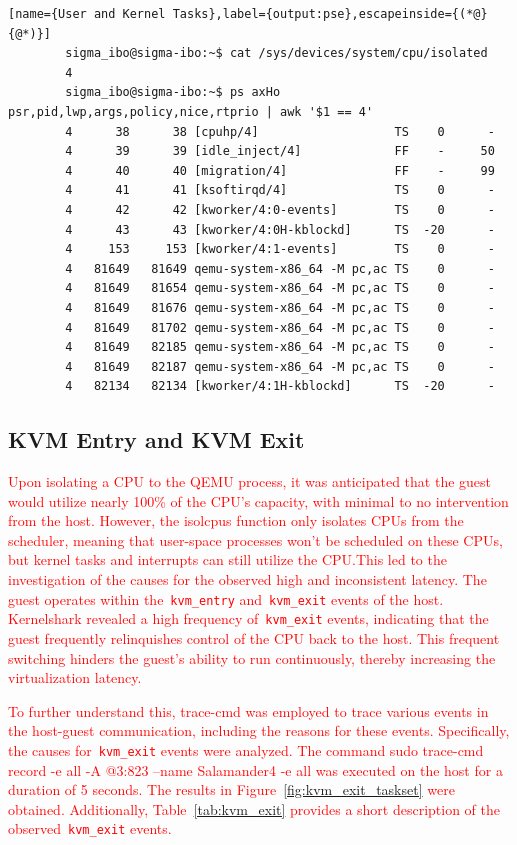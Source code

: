 \documentclass[MMR,Master,english]{twbook}
\begin{document}
\vspace{1em}
\begin{minipage}{0.95\columnwidth}
	\begin{lstlisting}[name={User and Kernel Tasks},label={output:pse},escapeinside={(*@}{@*)}]
		sigma_ibo@sigma-ibo:~$ cat /sys/devices/system/cpu/isolated
		4
		sigma_ibo@sigma-ibo:~$ ps axHo psr,pid,lwp,args,policy,nice,rtprio | awk '$1 == 4'
		4      38      38 [cpuhp/4]                   TS    0      -
		4      39      39 [idle_inject/4]             FF    -     50
		4      40      40 [migration/4]               FF    -     99
		4      41      41 [ksoftirqd/4]               TS    0      -
		4      42      42 [kworker/4:0-events]        TS    0      -
		4      43      43 [kworker/4:0H-kblockd]      TS  -20      -
		4     153     153 [kworker/4:1-events]        TS    0      -
		4   81649   81649 qemu-system-x86_64 -M pc,ac TS    0      -
		4   81649   81654 qemu-system-x86_64 -M pc,ac TS    0      -
		4   81649   81676 qemu-system-x86_64 -M pc,ac TS    0      -
		4   81649   81702 qemu-system-x86_64 -M pc,ac TS    0      -
		4   81649   82185 qemu-system-x86_64 -M pc,ac TS    0      -
		4   81649   82187 qemu-system-x86_64 -M pc,ac TS    0      -
		4   82134   82134 [kworker/4:1H-kblockd]      TS  -20      -
\end{lstlisting}
\end{minipage}
\subsection{KVM Entry and KVM Exit}\label{subsec:kvm_entry_exit}
\textcolor{red}{\noindent Upon isolating a CPU to the QEMU process, it was anticipated that the guest would utilize nearly 100\% of the CPU's capacity, with minimal to no intervention from the host. However, the isolcpus function only isolates CPUs from the scheduler, meaning that user-space processes won't be scheduled on these CPUs, but kernel tasks and interrupts can still utilize the CPU.This led to the investigation of the causes for the observed high and inconsistent latency. The guest operates within the~\texttt{kvm\_entry} and~\texttt{kvm\_exit} events of the host. Kernelshark revealed a high frequency of~\texttt{kvm\_exit} events, indicating that the guest frequently relinquishes control of the CPU back to the host. This frequent switching hinders the guest's ability to run continuously, thereby increasing the virtualization latency.}

\textcolor{red}{To further understand this, trace-cmd was employed to trace various events in the host-guest communication, including the reasons for these events. Specifically, the causes for~\texttt{kvm\_exit} events were analyzed. The command sudo trace-cmd record -e all -A @3:823 --name Salamander4 -e all was executed on the host for a duration of 5 seconds. The results in Figure~\ref{fig:kvm_exit_taskset} were obtained. Additionally, Table~\ref{tab:kvm_exit} provides a short description of the observed~\texttt{kvm\_exit} events.}
\end{document}
